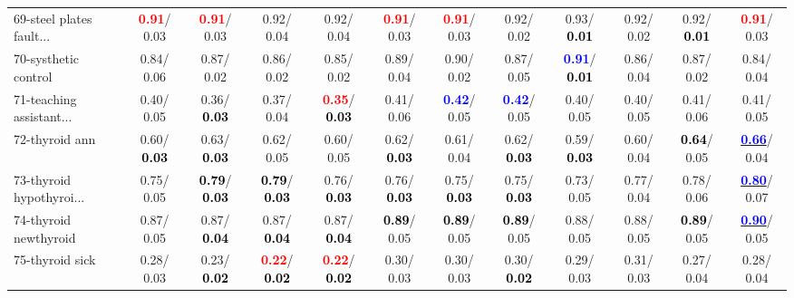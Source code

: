 \begin{table}[h]
\begin{center}
{\begin{tabular}{lc|c|c|c|c|c|c|c|c|c|c}
69-steel plates fault... & \textcolor{red}{\textbf{  0.91}}/  0.03 & \textcolor{red}{\textbf{  0.91}}/  0.03 &   0.92/  0.04 &   0.92/  0.04 & \textcolor{red}{\textbf{  0.91}}/  0.03 & \textcolor{red}{\textbf{  0.91}}/  0.03 &   0.92/  0.02 &   0.93/\textcolor{black}{\textbf{  0.01}} &   0.92/  0.02 &   0.92/\textcolor{black}{\textbf{  0.01}} & \textcolor{red}{\textbf{  0.91}}/  0.03 \\
70-systhetic control &   0.84/  0.06 &   0.87/  0.02 &   0.86/  0.02 &   0.85/  0.02 &   0.89/  0.04 &   0.90/  0.02 &   0.87/  0.05 & \textcolor{blue}{\textbf{  0.91}}/\textcolor{black}{\textbf{  0.01}} &   0.86/  0.04 &   0.87/  0.02 &   0.84/  0.04 \\
71-teaching assistant... &   0.40/  0.05 &   0.36/\textcolor{black}{\textbf{  0.03}} &   0.37/  0.04 & \textcolor{red}{\textbf{  0.35}}/\textcolor{black}{\textbf{  0.03}} &   0.41/  0.06 & \textcolor{blue}{\textbf{  0.42}}/  0.05 & \textcolor{blue}{\textbf{  0.42}}/  0.05 &   0.40/  0.05 &   0.40/  0.05 &   0.41/  0.06 &   0.41/  0.05 \\ \hline
72-thyroid ann &   0.60/\textcolor{black}{\textbf{  0.03}} &   0.63/\textcolor{black}{\textbf{  0.03}} &   0.62/  0.05 &   0.60/  0.05 &   0.62/\textcolor{black}{\textbf{  0.03}} &   0.61/  0.04 &   0.62/\textcolor{black}{\textbf{  0.03}} &   0.59/\textcolor{black}{\textbf{  0.03}} &   0.60/  0.04 & \textcolor{black}{\textbf{  0.64}}/  0.05 & \underline{\textcolor{blue}{\textbf{  0.66}}}/  0.04 \\
73-thyroid hypothyroi... &   0.75/  0.05 & \textcolor{black}{\textbf{  0.79}}/\textcolor{black}{\textbf{  0.03}} & \textcolor{black}{\textbf{  0.79}}/\textcolor{black}{\textbf{  0.03}} &   0.76/\textcolor{black}{\textbf{  0.03}} &   0.76/\textcolor{black}{\textbf{  0.03}} &   0.75/\textcolor{black}{\textbf{  0.03}} &   0.75/\textcolor{black}{\textbf{  0.03}} &   0.73/  0.05 &   0.77/  0.04 &   0.78/  0.06 & \underline{\textcolor{blue}{\textbf{  0.80}}}/  0.07 \\
74-thyroid newthyroid &   0.87/  0.05 &   0.87/\textcolor{black}{\textbf{  0.04}} &   0.87/\textcolor{black}{\textbf{  0.04}} &   0.87/\textcolor{black}{\textbf{  0.04}} & \textcolor{black}{\textbf{  0.89}}/  0.05 & \textcolor{black}{\textbf{  0.89}}/  0.05 & \textcolor{black}{\textbf{  0.89}}/  0.05 &   0.88/  0.05 &   0.88/  0.05 & \textcolor{black}{\textbf{  0.89}}/  0.05 & \underline{\textcolor{blue}{\textbf{  0.90}}}/  0.05 \\
75-thyroid sick &   0.28/  0.03 &   0.23/\textcolor{black}{\textbf{  0.02}} & \textcolor{red}{\textbf{  0.22}}/\textcolor{black}{\textbf{  0.02}} & \textcolor{red}{\textbf{  0.22}}/\textcolor{black}{\textbf{  0.02}} &   0.30/  0.03 &   0.30/  0.03 &   0.30/\textcolor{black}{\textbf{  0.02}} &   0.29/  0.03 &   0.31/  0.03 &   0.27/  0.04 &   0.28/  0.04 \\

\end{tabular}}
\end{center}
\end{table}

